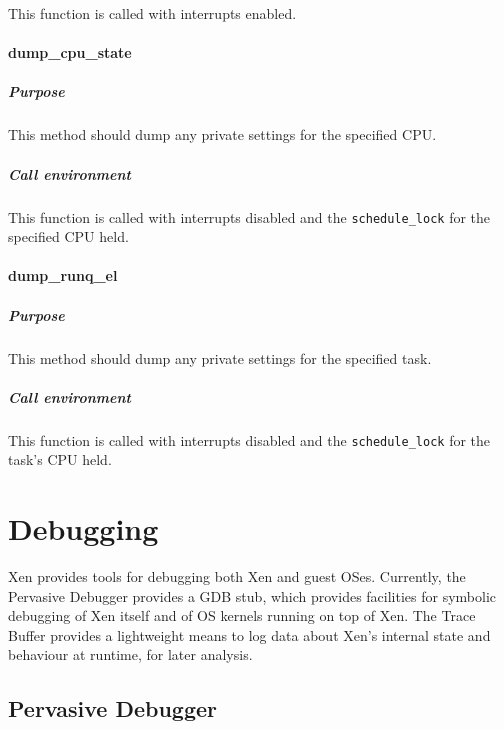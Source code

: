 \documentclass[11pt,twoside,final,openright]{xenstyle}
\begin{document}
This function is called with interrupts enabled.

\subsubsection{dump\_cpu\_state}

\paragraph*{Purpose}

This method should dump any private settings for the specified CPU.

\paragraph*{Call environment}

This function is called with interrupts disabled and the {\tt schedule\_lock}
for the specified CPU held.

\subsubsection{dump\_runq\_el}

\paragraph*{Purpose}

This method should dump any private settings for the specified task.

\paragraph*{Call environment}

This function is called with interrupts disabled and the {\tt schedule\_lock}
for the task's CPU held.

\chapter{Debugging}

Xen provides tools for debugging both Xen and guest OSes.  Currently, the
Pervasive Debugger provides a GDB stub, which provides facilities for symbolic
debugging of Xen itself and of OS kernels running on top of Xen.  The Trace
Buffer provides a lightweight means to log data about Xen's internal state and
behaviour at runtime, for later analysis.

\section{Pervasive Debugger}
\end{document}

